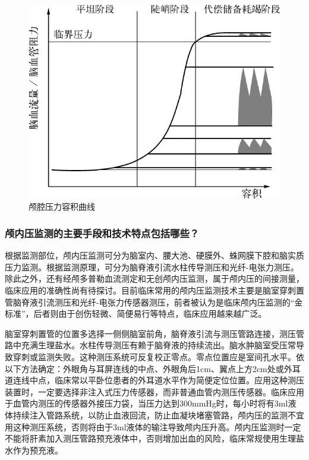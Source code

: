 \begin{figure}[!htbp]
 \centering
 \includegraphics{./images/Image00265.jpg}
 \captionsetup{justification=centering}
 \caption{颅腔压力容积曲线}
 \label{fig23-2}
  \end{figure} 

\subsubsection{颅内压监测的主要手段和技术特点包括哪些？}

根据监测部位，颅内压监测可分为脑室内、腰大池、硬膜外、蛛网膜下腔和脑实质压力监测。根据监测原理，可分为脑脊液引流水柱传导测压和光纤-电张力测压。除此之外，还有经颅多普勒血流测定和无创颅内压监测，属于颅内压的间接测量，临床应用的准确性尚有待探讨。目前临床常用的颅内压监测技术主要是脑室穿刺置管脑脊液引流测压和光纤-电张力传感器测压，前者被认为是临床颅内压监测的“金标准”，后者则由于创伤轻微、简便易行等特点，临床应用越来越广泛。

脑室穿刺置管的位置多选择一侧侧脑室前角，脑脊液引流与测压管路连接，测压管路中充满生理盐水。水柱传导测压有赖于脑脊液的持续流出。脑水肿脑室受压常导致穿刺或监测失败。这种测压系统可反复校正零点。零点位置应是室间孔水平。依以下方法确定：外眼角与耳屏连线的中点、外眼角后1cm、翼点上方2cm处或外耳道连线中点，临床常以平卧位患者的外耳道水平作为简便定位位置。应用这种测压装置时，一定要选择非注入式压力传感器，而非普通血管内测压传感器。临床应用于血管内测压的传感器外接压力袋，当压力达到300mmHg时，每小时将有3ml液体持续注入管路系统，以防止血液回流，防止血凝块堵塞管路，颅内压的监测不宜用这种测压系统，否则将由于3ml液体的输注导致颅内压升高。颅内压监测时一定不能将肝素加入测压管路预充液体中，否则增加出血的风险，临床常规使用生理盐水作为预充液。

